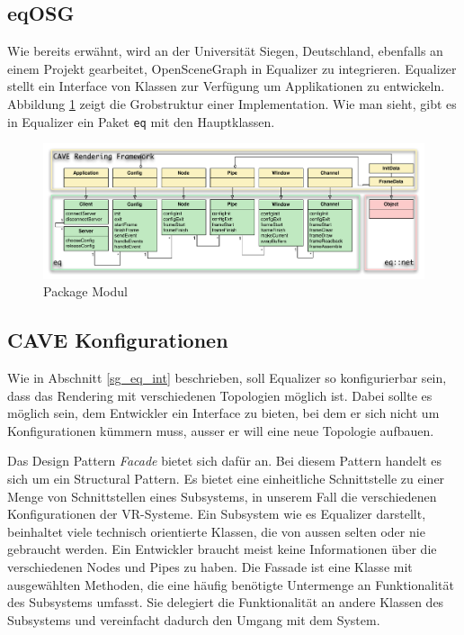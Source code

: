 \subsection{eqOSG}
Wie bereits erw\"ahnt, wird an der Universit\"at Siegen, Deutschland, ebenfalls an einem Projekt gearbeitet, OpenSceneGraph in Equalizer zu integrieren. 
Equalizer stellt ein Interface von Klassen zur Verf\"ugung um Applikationen zu entwickeln. Abbildung \ref{pack_mod} zeigt die Grobstruktur einer Implementation. Wie man sieht, gibt es in Equalizer ein Paket \texttt{eq} mit den Hauptklassen. 

\begin{figure}[ht]
\centering
\includegraphics[scale=0.4]{../figures/crf_namespaces}
\caption{Package Modul}
\label{pack_mod}
\end{figure}

\subsection{CAVE Konfigurationen}
Wie in Abschnitt \ref{sg_eq_int} beschrieben, soll Equalizer so konfigurierbar sein, dass das Rendering mit verschiedenen Topologien m\"oglich ist. Dabei sollte es m\"oglich sein, dem Entwickler ein Interface zu bieten, bei dem er sich nicht um Konfigurationen k\"ummern muss, ausser er will eine neue Topologie aufbauen.

Das Design Pattern \textit{Facade} bietet sich daf\"ur an. Bei diesem Pattern handelt es sich um ein Structural Pattern. Es bietet eine einheitliche Schnittstelle zu einer Menge von Schnittstellen eines Subsystems, in unserem Fall die verschiedenen Konfigurationen der VR-Systeme.
Ein Subsystem wie es Equalizer darstellt, beinhaltet viele technisch orientierte Klassen, die von aussen selten oder nie gebraucht werden. Ein Entwickler braucht meist keine Informationen \"uber die verschiedenen Nodes und Pipes zu haben. Die Fassade ist eine Klasse mit ausgew\"ahlten Methoden, die eine h\"aufig ben\"otigte Untermenge an Funktionalit\"at des Subsystems umfasst. Sie delegiert die Funktionalit\"at an andere Klassen des Subsystems und vereinfacht dadurch den Umgang mit dem System.


